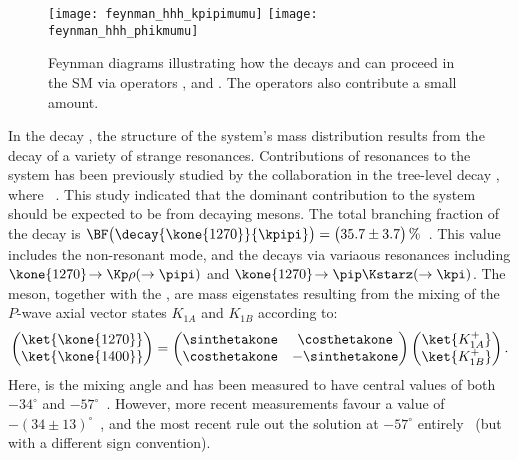 \begin{figure}
  \begin{center}
    \texttt{[image: feynman\_hhh\_kpipimumu]}
    \texttt{[image: feynman\_hhh\_phikmumu]}
    \caption[Feynman diagrams for \btokpipimumu and \btophikmumu]
    {
      Feynman diagrams illustrating how the decays \btokpipimumu and \btophikmumu can proceed in
      the SM via operators ,  and .
      The operators  also contribute a small amount.
    }
    \label{fig:hhh:feyn}
  \end{center}
\end{figure}

In the decay \btokpipimumu, the structure of the \kpipi system's mass distribution results from the
decay of a variety of strange resonances.
Contributions of resonances to the \kpipi system has been previously studied by the \belle
collaboration in the tree-level decay \btojpsikpipi, where \jpsitomumu~\cite{Guler:2010if}.
This study indicated that the dominant contribution to the \kpipi system should be expected
to be from decaying  mesons.
The total branching fraction of the decay 
is
$\BF\big(\decay{\kone{1270}}{\kpipi}\big)=\big(35.7\pm3.7\big)\,\%$~\cite{PDG2012}.
This value includes the non-resonant mode, and the decays via variaous resonances including
$\kone{1270}\!\to\Kp\rho(\to\pipi)$ and $\kone{1270}\!\to\pip\Kstarz(\to\kpi)$.
The  meson, together with the , are mass eigenstates resulting from the
mixing of the $P$-wave axial vector states $K_{1A}$ and $K_{1B}$ according to:
\begin{equation}
  \begin{pmatrix}
    \ket{\kone{1270}} \\
    \ket{\kone{1400}}
  \end{pmatrix}
  =
  \begin{pmatrix}
    \sinthetakone & \costhetakone \\
    \costhetakone & -\sinthetakone
  \end{pmatrix}
  \begin{pmatrix}
    \ket{K_{1A}^+} \\
    \ket{K_{1B}^+}
  \end{pmatrix}.
  \label{eq:k1mixing}
\end{equation}
Here, \thetakone is the mixing angle and has been measured to have central values of both
$-34^\circ$ and
$-57^\circ$~\cite{PhysRevD.47.1252,Tayduganov:2011ui,Hatanaka:2008xj,Cheng:2011pb,Divotgey:2013jba,Cheng:2013cwa}.
However, more recent measurements favour a value of
$-(34\pm13)^\circ$~\cite{Hatanaka:2008xj,Cheng:2011pb,Divotgey:2013jba,Cheng:2013cwa},
and the most recent rule out the solution at $-57^\circ$
entirely~\cite{Divotgey:2013jba,Cheng:2013cwa}
(but with a different sign convention).

